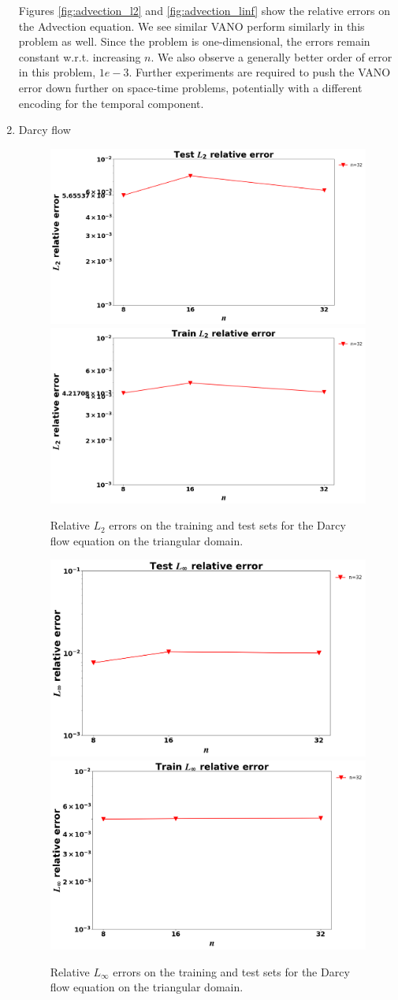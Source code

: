 \documentclass[11pt, fullpage,letterpaper]{article}
\begin{document}
\begin{enumerate}
Figures \ref{fig:advection_l2} and \ref{fig:advection_linf} show the relative errors on the Advection equation. We see similar VANO perform similarly in this problem as well. Since the problem is one-dimensional, the errors remain constant w.r.t. increasing $n$. We also observe a generally better order of error in this problem, $1e-3$. Further experiments are required to push the VANO error down further on space-time problems, potentially with a different encoding for the temporal component.

\item Darcy flow

\begin{figure}[h]
    \centering
    \includegraphics[width=0.5\linewidth]{all_plots/Darcy_triangular/test_l2_vs_size.png} 
    \includegraphics[width=0.5\linewidth]{all_plots/Darcy_triangular/train_l2_vs_size.png} 
    \caption{Relative $L_2$ errors on the training and test sets for the Darcy flow equation on the triangular domain.}
    \label{fig:darcy_tri_l2}
\end{figure}

\begin{figure}[h]
    \centering
    \includegraphics[width=0.5\linewidth]{all_plots/Darcy_triangular/test_linf_vs_size.png} 
    \includegraphics[width=0.5\linewidth]{all_plots/Darcy_triangular/train_linf_vs_size.png} 
    \caption{Relative $L_\infty$ errors on the training and test sets for the Darcy flow equation on the triangular domain.}
    \label{fig:darcy_tri_linf}
\end{figure}


\end{enumerate}
\end{document}
